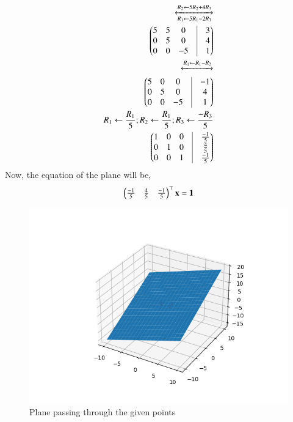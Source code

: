 \documentclass[A4,10pt,twocolumn]{IEEEtran}
\begin{document}
\begin{align}
\xleftrightarrow[R_1 \leftarrow 5R_1 - 2R_3]{R_2 \leftarrow 5R_2 + 4R_3}\\
\myvec{5&5&0&\vrule&3\\0&5&0&\vrule&4\\0&0&-5&\vrule&1}\\
\xleftrightarrow{R_1 \leftarrow R_1 - R_2}\\
\myvec{5&0&0&\vrule&-1\\0&5&0&\vrule&4\\0&0&-5&\vrule&1}\\
{R_1 \leftarrow \frac{R_1}{5}} ; {R_2 \leftarrow \frac{R_1}{5}}; {R_3 \leftarrow \frac{-R_3}{5}}\\
\myvec{1&0&0&\vrule&\frac{-1}{5}  \\ 0&1&0&\vrule&\frac{4}{5} \\0&0&1&\vrule&\frac{-1}{5}}
\end{align}
Now, the equation of the plane will be,
\begin{align}
\begin{pmatrix}\frac{-1}{5} & \frac{4}{5} & \frac{-1}{5}\end{pmatrix}^\top \mathbf{x} = \mathbf{1}
\end{align}
\begin{figure}[h!]
  \centering
   \includegraphics[width=\columnwidth]{figs/plane_b.png}
    \caption{Plane passing through the given points }
     \label{fig:2}
     \end{figure} 
\end{document}
